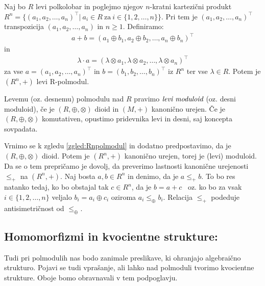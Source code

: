 \documentclass[mat1]{fmfdelo}
\newcommand{\pojem}[1]{\ensuremath{\emph{#1}}}
\begin{document}
\begin{zgled}
	\label{zgled:Rnpolmodul}
	Naj bo $R$ levi polkolobar in poglejmo njegov $n$-kratni kartezični produkt $R^n = \{(a_1, a_2, \ldots, a_n)^{\top} |~ a_i \in R~\text{za}~i\in \{1, 2, \ldots, n\}\}$. Pri tem je $(a_1, a_2, \ldots, a_n)^{\top}$ transpozicija $(a_1, a_2, \ldots, a_n)$ in $n\geq 1$. Definiramo:
	\begin{align*}
		a + b = (a_1 \oplus b_1, a_2 \oplus b_2, \ldots, a_n \oplus b_n)^{\top}
	\end{align*}
	in
	\begin{align*}
		\lambda\cdot a = (\lambda\otimes a_1,\lambda\otimes a_2, \ldots,\lambda\otimes a_n)^{\top}
	\end{align*}
	za vse $a = (a_1, a_2, \ldots, a_n)^{\top}$ in $b = (b_1, b_2, \ldots, b_n)^{\top}$ iz $R^n$ ter vse $\lambda \in R$. Potem je $(R^n, +)$ levi R-polmodul.
\end{zgled}

\begin{definicija}
	Levemu (oz. desnemu) polmodulu nad $R$ pravimo \pojem{levi~moduloid} (oz. desni moduloid), če je $(R, \oplus, \otimes)$ dioid in $(M, +)$ kanonično urejen. Če je $(R, \oplus, \otimes)$ komutativen, opustimo pridevnika levi in desni, saj koncepta sovpadata.
\end{definicija}

\begin{zgled}
	Vrnimo se k zgledu \ref{zgled:Rnpolmodul} in dodatno predpostavimo, da je $(R, \oplus, \otimes)$ dioid. Potem je $(R^n, +)$ kanonično urejen, torej je (levi) moduloid.
	Da se o tem prepričamo je dovolj, da preverimo lastnosti kanonične urejenosti $\leq_+$ na $(R^n, +)$. Naj bosta $a, b \in R^n$ in denimo, da je $a \leq_+ b$. To bo res natanko tedaj, ko bo obstajal tak $c\in R^n$, da je $b = a + c$~ oz. ko bo za vsak $i\in \{1, 2, \ldots, n\}$ veljalo $b_i = a_i \oplus c_i$ oziroma $a_i \leq_\oplus b_i$. Relacija $\leq_+$ podeduje antisimetričnost od $\leq_\oplus$.
\end{zgled}

\subsection{Homomorfizmi in kvocientne strukture:}\label{subsect:homomorphsemimodule}
Tudi pri polmodulih nas bodo zanimale preslikave, ki ohranjajo algebraično strukturo. Pojavi se tudi vprašanje, ali lahko nad polmoduli tvorimo kvocientne strukture. Oboje bomo obravnavali v tem podpoglavju.
\end{document}
